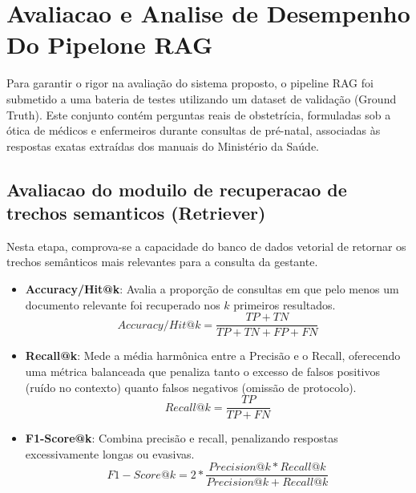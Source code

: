 \documentclass[12pt]{article}
\begin{document}


\section{Avaliacao e Analise de Desempenho Do Pipelone RAG}

Para garantir o rigor na avaliação do sistema proposto, o pipeline RAG foi submetido a uma bateria de testes utilizando um dataset de validação (Ground Truth).
Este conjunto contém perguntas reais de obstetrícia, formuladas sob a ótica de médicos e enfermeiros durante consultas de pré-natal, associadas às respostas exatas extraídas dos manuais do Ministério da Saúde.

\subsection{Avaliacao do moduilo de recuperacao de trechos semanticos (Retriever)}
Nesta etapa, comprova-se a capacidade do banco de dados vetorial de retornar os trechos semânticos mais relevantes para a consulta da gestante.

\begin{itemize}
  \item \textbf{Accuracy/Hit@k}: Avalia a proporção de consultas em que pelo menos um documento relevante foi recuperado nos $k$ primeiros resultados.
  \begin{equation}
    Accuracy/Hit@k = \frac{TP + TN}{TP + TN + FP + FN}
  \end{equation}
  
  \item \textbf{Recall@k}: Mede a média harmônica entre a Precisão e o Recall, oferecendo uma métrica balanceada que penaliza tanto o excesso de falsos positivos (ruído no contexto) quanto falsos negativos (omissão de protocolo).
  \begin{equation}
    Recall@k = \frac{TP}{TP + FN}
  \end{equation}

  \item \textbf{F1-Score@k}: Combina precisão e recall, penalizando respostas excessivamente longas ou evasivas.
  \begin{equation}
    F1-Score@k = 2 * \frac{Precision@k * Recall@k}{Precision@k + Recall@k}
  \end{equation}
\end{itemize}
\end{document}
